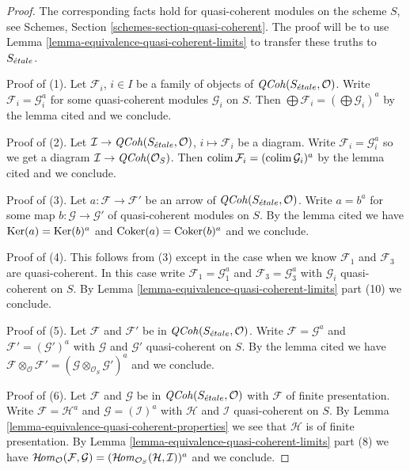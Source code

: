\begin{proof}
The corresponding facts hold for quasi-coherent modules on the scheme $S$,
see Schemes, Section \ref{schemes-section-quasi-coherent}. The proof will
be to use Lemma \ref{lemma-equivalence-quasi-coherent-limits} to transfer
these truths to $S_{\acute{e}tale}$.

\medskip\noindent
Proof of (1). Let $\mathcal{F}_i$, $i \in I$ be a family of objects of
$\mathit{QCoh}(S_{\acute{e}tale}, \mathcal{O})$. Write $\mathcal{F}_i = \mathcal{G}_i^a$
for some quasi-coherent modules $\mathcal{G}_i$ on $S$.
Then $\bigoplus \mathcal{F}_i = (\bigoplus \mathcal{G}_i)^a$ by
the lemma cited and we conclude.

\medskip\noindent
Proof of (2). Let $\mathcal{I} \to \mathit{QCoh}(S_{\acute{e}tale}, \mathcal{O})$,
$i \mapsto \mathcal{F}_i$ be a diagram. Write
$\mathcal{F}_i = \mathcal{G}_i^a$ so we get a diagram
$\mathcal{I} \to \mathit{QCoh}(\mathcal{O}_S)$.
Then $\mathop{\mathrm{colim}}\nolimits \mathcal{F}_i = (\mathop{\mathrm{colim}}\nolimits \mathcal{G}_i)^a$ by
the lemma cited and we conclude.

\medskip\noindent
Proof of (3). Let $a : \mathcal{F} \to \mathcal{F}'$
be an arrow of $\mathit{QCoh}(S_{\acute{e}tale}, \mathcal{O})$.
Write $a = b^a$ for some map $b : \mathcal{G} \to \mathcal{G}'$
of quasi-coherent modules on $S$. By the lemma cited
we have $\mathop{\mathrm{Ker}}(a) = \mathop{\mathrm{Ker}}(b)^a$ and $\mathop{\mathrm{Coker}}(a) = \mathop{\mathrm{Coker}}(b)^a$
and we conclude.

\medskip\noindent
Proof of (4). This follows from (3) except in the case when
we know $\mathcal{F}_1$ and $\mathcal{F}_3$ are quasi-coherent.
In this case write $\mathcal{F}_1 = \mathcal{G}_1^a$
and $\mathcal{F}_3 = \mathcal{G}_3^a$ with
$\mathcal{G}_i$ quasi-coherent on $S$.
By Lemma \ref{lemma-equivalence-quasi-coherent-limits} part (10)
we conclude.

\medskip\noindent
Proof of (5). Let $\mathcal{F}$ and $\mathcal{F}'$
be in $\mathit{QCoh}(S_{\acute{e}tale}, \mathcal{O})$.
Write $\mathcal{F} = \mathcal{G}^a$
and $\mathcal{F}' = (\mathcal{G}')^a$
with $\mathcal{G}$ and $\mathcal{G}'$ quasi-coherent on $S$.
By the lemma cited we have
$\mathcal{F} \otimes_\mathcal{O} \mathcal{F}' =
(\mathcal{G} \otimes_{\mathcal{O}_S} \mathcal{G}')^a$
and we conclude.

\medskip\noindent
Proof of (6). Let $\mathcal{F}$ and $\mathcal{G}$
be in $\mathit{QCoh}(S_{\acute{e}tale}, \mathcal{O})$ with $\mathcal{F}$
of finite presentation. Write $\mathcal{F} = \mathcal{H}^a$
and $\mathcal{G} = (\mathcal{I})^a$
with $\mathcal{H}$ and $\mathcal{I}$ quasi-coherent on $S$.
By Lemma \ref{lemma-equivalence-quasi-coherent-properties}
we see that $\mathcal{H}$ is of finite presentation.
By Lemma \ref{lemma-equivalence-quasi-coherent-limits} part (8)
we have
$\mathop{\mathcal{H}\!\mathit{om}}\nolimits_\mathcal{O}(\mathcal{F}, \mathcal{G}) =
(\mathop{\mathcal{H}\!\mathit{om}}\nolimits_{\mathcal{O}_S}(\mathcal{H}, \mathcal{I}))^a$
and we conclude.
\end{proof}


